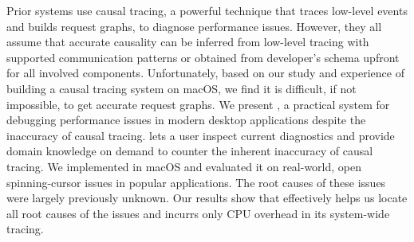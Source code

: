 Prior systems use causal tracing, a powerful technique that traces low-level
events and builds request graphs, to diagnose performance issues. However, they
all assume that accurate causality can be inferred from low-level tracing with
supported communication patterns or obtained from developer's schema upfront
for all involved components.  Unfortunately, based on our study and experience
of building a causal tracing system on macOS, we find it is difficult, if not
impossible, to get accurate request graphs.
We present \xxx, a practical system for debugging performance issues in modern
desktop applications despite the inaccuracy of causal tracing. \xxx lets a user
inspect current diagnostics and provide domain knowledge on demand to counter
the inherent inaccuracy of causal tracing. We implemented \xxx in macOS and
evaluated it on \nbug real-world, open spinning-cursor issues in popular
applications. The root causes of these issues were largely previously unknown.
Our results show that \xxx effectively helps us locate all root causes of the
issues and incurrs only \cpuoverhead CPU overhead in its system-wide tracing.
